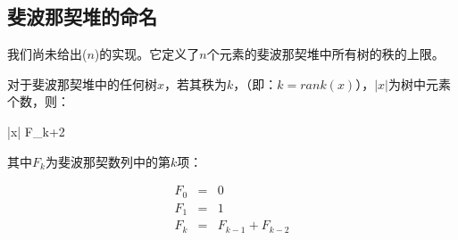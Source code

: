 \documentclass[b5paper]{ctexart}
\begin{document}
\subsection{斐波那契堆的命名}

我们尚未给出($n$)的实现。它定义了$n$个元素的斐波那契堆中所有树的秩的上限。

\begin{lemma}
\label{lemma:Fib-degree}
对于斐波那契堆中的任何树$x$，若其秩为$k$，（即：$k = rank(x)$），$|x|$为树中元素个数，则：

\be
  |x| \geq F_{k+2}
\ee

其中$F_k$为斐波那契数列中的第$k$项：

\[
\begin{array}{rcl}
F_0 & = & 0 \\
F_1 & = & 1 \\
F_k & = & F_{k-1} + F_{k-2} \\
\end{array}
\]
\end{lemma}
\end{document}
